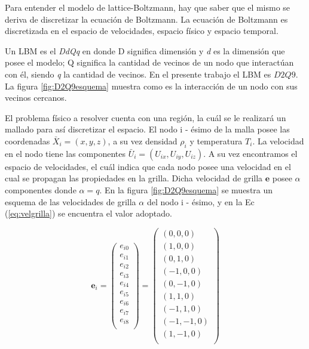 Para entender el modelo de lattice-Boltzmann, hay que saber que el mismo se deriva de discretizar la ecuación de Boltzmann.
La ecuación de Boltzmann es discretizada en el espacio de velocidades, espacio físico y espacio temporal.

Un LBM es el \textit{DdQq} en donde D significa dimensión y \textit{d} es la dimensión que posee el modelo; 
Q significa la cantidad de vecinos de un nodo que interactúan con él, siendo  \textit{q} la cantidad de vecinos.
En el presente trabajo el LBM es $D2Q9$. La figura \ref{fig:D2Q9esquema} muestra como es la interacción de un nodo con sus vecinos cercanos.



El problema físico a resolver cuenta con una región, la cuál se le realizará un mallado para así discretizar el espacio. 
El nodo i - ésimo de la malla posee las coordenadas ${\bar{X}}_{i} = (x,y,z)$, a su vez densidad $\rho_{i}$ y temperatura $T_{i}$.
La velocidad en el nodo tiene las componentes ${\bar{U}}_{i} = ({U}_{ix},{U}_{iy},{U}_{iz})$.
A su vez encontramos el espacio de velocidades, el cuál indica que cada nodo posee una velocidad en el cual se propagan las propiedades en la grilla.
Dicha velocidad de grilla $\mathbf{e}$ posee $\alpha$ componentes donde $\alpha = q $. En la figura \ref{fig:D2Q9esquema} se muestra un esquema de
las velocidades de grilla $\alpha$ del nodo i - ésimo, y en la Ec (\ref{eq:velgrilla}) se encuentra el valor adoptado.


\begin{equation}
    {\mathbf{e}}_{i} =  
    \left( \begin{array}{c} 
                e_{i0} \\ e_{i1}\\ e_{i2}\\ e_{i3}\\ e_{i4}\\ e_{i5}\\
                e_{i6}\\ e_{i7}\\ e_{i8}\\
            \end{array}
    \right) =
    \left( \begin{array}{c} 
        (0,0,0) \\ (1,0,0) \\ (0,1,0) \\(-1,0,0) \\ (0,-1,0) \\ (1,1,0) \\
        (-1,1,0) \\ (-1,-1,0) \\ (1,-1,0)\\ 
    \end{array}
    \right) 
    \label{eq:velgrilla}
\end{equation}

